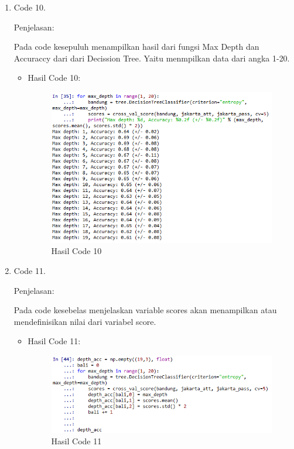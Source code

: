 \begin{itemize}
\begin{enumerate}
\begin{itemize}
\end{itemize}
\par
\item Code 10.
\par Penjelasan:
\par
Pada code kesepuluh menampilkan hasil dari fungsi Max Depth dan Accuraccy dari dari Decission Tree. Yaitu menmpilkan data dari angka 1-20.
\begin{itemize}
\par
\item Hasil Code 10:

\begin{figure}[ht]
\centering
\includegraphics[scale=0.4]{figures/AnnisaFathoroni-10.png}
\caption{Hasil Code 10}
\label{contoh}
\end{figure}

\end{itemize}
\par
\item Code 11.
\par Penjelasan:
\par 
Pada code kesebelas menjelaskan variable scores akan menampilkan atau mendefinisikan nilai dari variabel score.
\begin{itemize}
\par
\item Hasil Code 11:

\begin{figure}[ht]
\centering
\includegraphics[scale=0.8]{figures/AnnisaFathoroni-11a.png}
\caption{Hasil Code 11}
\label{contoh}
\end{figure}


\end{itemize}
\end{enumerate}
\end{itemize}

